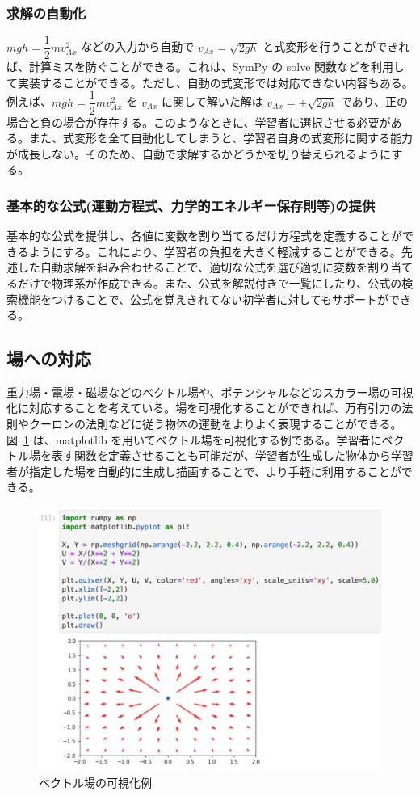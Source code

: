 \subsubsection{求解の自動化}
$mgh = \dfrac{1}{2}mv_{Ax}^2$ などの入力から自動で $v_{Ax} = \sqrt{2gh}$ と式変形を行うことができれば、計算ミスを防ぐことができる。これは、SymPy の solve 関数などを利用して実装することができる。ただし、自動の式変形では対応できない内容もある。例えば、$mgh = \dfrac{1}{2}mv_{Ax}^2$ を $v_{Ax}$ に関して解いた解は $v_{Ax} = \pm\sqrt{2gh}$ であり、正の場合と負の場合が存在する。このようなときに、学習者に選択させる必要がある。また、式変形を全て自動化してしまうと、学習者自身の式変形に関する能力が成長しない。そのため、自動で求解するかどうかを切り替えられるようにする。

\subsubsection{基本的な公式(運動方程式、力学的エネルギー保存則等)の提供}
基本的な公式を提供し、各値に変数を割り当てるだけ方程式を定義することができるようにする。これにより、学習者の負担を大きく軽減することができる。先述した自動求解を組み合わせることで、適切な公式を選び適切に変数を割り当てるだけで物理系が作成できる。また、公式を解説付きで一覧にしたり、公式の検索機能をつけることで、公式を覚えきれてない初学者に対してもサポートができる。


\subsection{場への対応} \label{6.2.3}
重力場・電場・磁場などのベクトル場や、ポテンシャルなどのスカラー場の可視化に対応することを考えている。場を可視化することができれば、万有引力の法則やクーロンの法則などに従う物体の運動をよりよく表現することができる。図~\ref{field_example} は、matplotlib を用いてベクトル場を可視化する例である。学習者にベクトル場を表す関数を定義させることも可能だが、学習者が生成した物体から学習者が指定した場を自動的に生成し描画することで、より手軽に利用することができる。

\begin{figure}[htb]
  \centering
  \includegraphics[width=0.9\linewidth]{work/field_example.png}
  \caption{ベクトル場の可視化例} \label{field_example}
\end{figure}


